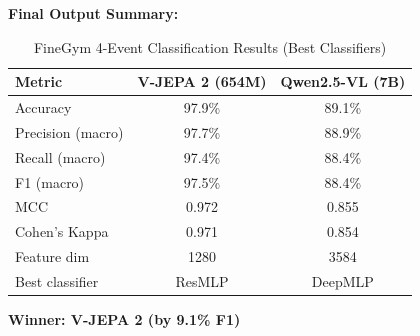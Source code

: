 \textbf{Final Output Summary:}

\begin{table}[H]
\centering
\begin{tabular}{lcc}
\toprule
\textbf{Metric} & \textbf{V-JEPA 2 (654M)} & \textbf{Qwen2.5-VL (7B)} \\
\midrule
Accuracy            & 97.9\% & 89.1\% \\
Precision (macro)   & 97.7\% & 88.9\% \\
Recall (macro)      & 97.4\% & 88.4\% \\
F1 (macro)          & 97.5\% & 88.4\% \\
MCC                 & 0.972   & 0.855  \\
Cohen's Kappa       & 0.971   & 0.854  \\
\midrule
Feature dim         & 1280    & 3584   \\
Best classifier     & ResMLP  & DeepMLP \\
\bottomrule
\end{tabular}
\caption{FineGym 4-Event Classification Results (Best Classifiers)}
\end{table}

\textbf{Winner: V-JEPA 2 (by 9.1\% F1)}

